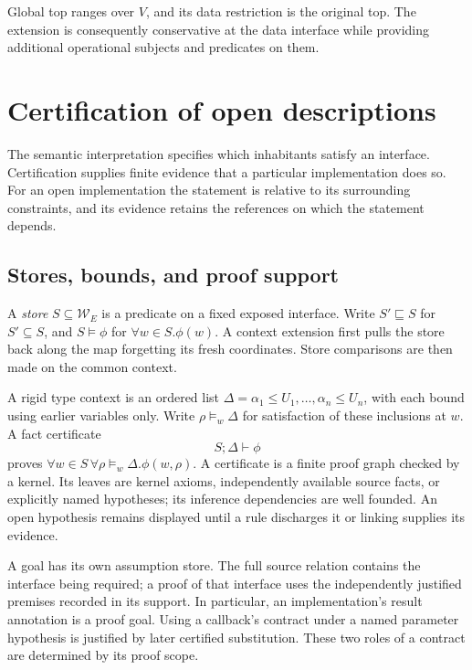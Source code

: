 \documentclass[10pt,a4paper]{article}
\theoremstyle{remark}
\begin{document}
Global top ranges over $V$, and its data restriction is the original top.
The extension is consequently conservative at the data interface while
providing additional operational subjects and predicates on them.

\section{Certification of open descriptions}
\label{sec:typing}
The semantic interpretation specifies which inhabitants satisfy an interface.
Certification supplies finite evidence that a particular implementation does
so. For an open implementation the statement is relative to its surrounding
constraints, and its evidence retains the references on which the statement
depends.

\subsection{Stores, bounds, and proof support}
A \emph{store} $S\subseteq\mathcal W_E$ is a predicate on a fixed exposed
interface. Write $S'\sqsubseteq S$ for $S'\subseteq S$, and
$S\models\phi$ for $\forall w\in S.\phi(w)$. A context extension first
pulls the store back along the map forgetting its fresh coordinates. Store
comparisons are then made on the common context.

A rigid type context is an ordered list
$\Delta=\alpha_1\le U_1,\ldots,\alpha_n\le U_n$, with each bound using
earlier variables only. Write $\rho\models_w\Delta$ for satisfaction of
these inclusions at $w$. A fact certificate
\[
 S;\Delta\vdash\phi
\]
proves $\forall w\in S\,\forall\rho\models_w\Delta.\phi(w,\rho)$.
A certificate is a finite proof graph checked by a kernel. Its leaves are
kernel axioms, independently available source facts, or explicitly named
hypotheses; its inference dependencies are well founded. An open hypothesis
remains displayed until a rule discharges it or linking supplies its evidence.

A goal has its own assumption store. The full source relation contains the
interface being required; a proof of that interface uses the independently
justified premises recorded in its support. In particular, an implementation's
result annotation is a proof goal. Using a callback's contract under a named
parameter hypothesis is justified by later certified substitution. These two
roles of a contract are determined by its proof scope.
\end{document}
